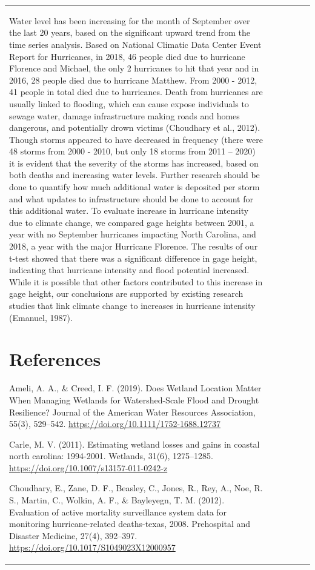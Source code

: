 \documentclass[
  12pt,
]{article}
\begin{document}
\begin{table}
\begin{tabular}[t]{|>{}l|||>{}r|||>{}r|||>{}r|||>{}r||r}
Water level has been increasing for the month of September over the last
20 years, based on the significant upward trend from the time series
analysis. Based on National Climatic Data Center Event Report for
Hurricanes, in 2018, 46 people died due to hurricane Florence and
Michael, the only 2 hurricanes to hit that year and in 2016, 28 people
died due to hurricane Matthew. From 2000 - 2012, 41 people in total died
due to hurricanes. Death from hurricanes are usually linked to flooding,
which can cause expose individuals to sewage water, damage
infrastructure making roads and homes dangerous, and potentially drown
victims (Choudhary et al., 2012). Though storms appeared to have
decreased in frequency (there were 48 storms from 2000 - 2010, but only
18 storms from 2011 -- 2020) it is evident that the severity of the
storms has increased, based on both deaths and increasing water levels.
Further research should be done to quantify how much additional water is
deposited per storm and what updates to infrastructure should be done to
account for this additional water. To evaluate increase in hurricane
intensity due to climate change, we compared gage heights between 2001,
a year with no September hurricanes impacting North Carolina, and 2018,
a year with the major Hurricane Florence. The results of our t-test
showed that there was a significant difference in gage height,
indicating that hurricane intensity and flood potential increased. While
it is possible that other factors contributed to this increase in gage
height, our conclusions are supported by existing research studies that
link climate change to increases in hurricane intensity (Emanuel, 1987).

\newpage

\hypertarget{references}{%
\section{References}\label{references}}

Ameli, A. A., \& Creed, I. F. (2019). Does Wetland Location Matter When
Managing Wetlands for Watershed-Scale Flood and Drought Resilience?
Journal of the American Water Resources Association, 55(3), 529--542.
\url{https://doi.org/10.1111/1752-1688.12737}

Carle, M. V. (2011). Estimating wetland losses and gains in coastal
north carolina: 1994-2001. Wetlands, 31(6), 1275--1285.
\url{https://doi.org/10.1007/s13157-011-0242-z}

Choudhary, E., Zane, D. F., Beasley, C., Jones, R., Rey, A., Noe, R. S.,
Martin, C., Wolkin, A. F., \& Bayleyegn, T. M. (2012). Evaluation of
active mortality surveillance system data for monitoring
hurricane-related deaths-texas, 2008. Prehospital and Disaster Medicine,
27(4), 392--397. \url{https://doi.org/10.1017/S1049023X12000957}


\end{tabular}
\end{table}
\end{document}
